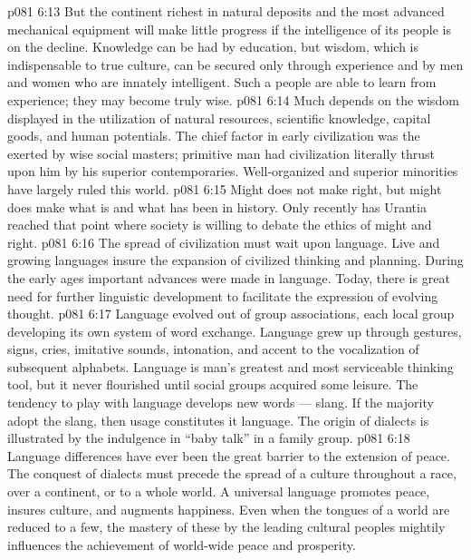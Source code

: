 \vs p081 6:13 But the continent richest in natural deposits and the most advanced mechanical equipment will make little progress if the intelligence of its people is on the decline. Knowledge can be had by education, but wisdom, which is indispensable to true culture, can be secured only through experience and by men and women who are innately intelligent. Such a people are able to learn from experience; they may become truly wise.
\vs p081 6:14 \pc {}\bibnobreakspace {} Much depends on the wisdom displayed in the utilization of natural resources, scientific knowledge, capital goods, and human potentials. The chief factor in early civilization was the  exerted by wise social masters; primitive man had civilization literally thrust upon him by his superior contemporaries. Well\hyp{}organized and superior minorities have largely ruled this world.
\vs p081 6:15 Might does not make right, but might does make what is and what has been in history. Only recently has Urantia reached that point where society is willing to debate the ethics of might and right.
\vs p081 6:16 \pc {}\bibnobreakspace {} The spread of civilization must wait upon language. Live and growing languages insure the expansion of civilized thinking and planning. During the early ages important advances were made in language. Today, there is great need for further linguistic development to facilitate the expression of evolving thought.
\vs p081 6:17 Language evolved out of group associations, each local group developing its own system of word exchange. Language grew up through gestures, signs, cries, imitative sounds, intonation, and accent to the vocalization of subsequent alphabets. Language is man’s greatest and most serviceable thinking tool, but it never flourished until social groups acquired some leisure. The tendency to play with language develops new words --- slang. If the majority adopt the slang, then usage constitutes it language. The origin of dialects is illustrated by the indulgence in “baby talk” in a family group.
\vs p081 6:18 Language differences have ever been the great barrier to the extension of peace. The conquest of dialects must precede the spread of a culture throughout a race, over a continent, or to a whole world. A universal language promotes peace, insures culture, and augments happiness. Even when the tongues of a world are reduced to a few, the mastery of these by the leading cultural peoples mightily influences the achievement of world\hyp{}wide peace and prosperity.

